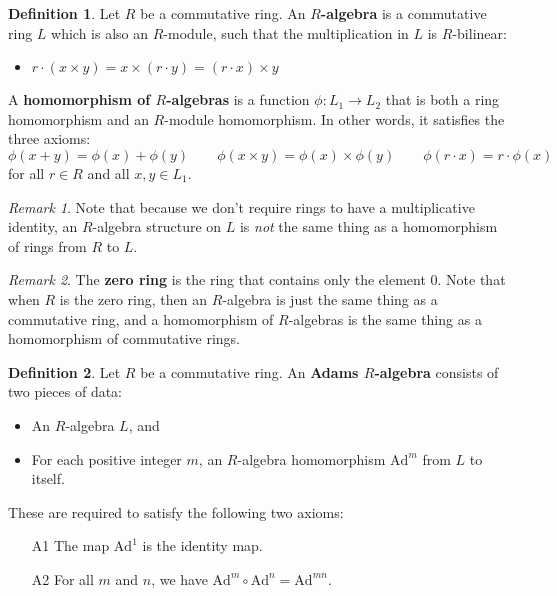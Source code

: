 \documentclass[a4paper]{article}
\theoremstyle{definition}
\newtheorem{definition}{Definition}[section]
\theoremstyle{remark}
\newtheorem*{remark}{Remark}
\newcommand{\ad}[1]{\text{Ad}^{#1}}
\newcommand{\defhl}[1]{\textbf{#1}}
\begin{document}
\begin{definition}
Let $R$ be a commutative ring. An \defhl{$R$-algebra} is a commutative ring $L$ which is also an $R$-module, such that the multiplication in $L$ is $R$-bilinear:
\begin{itemize}
\item $ r\cdot(x \times y) = x \times (r \cdot y) = (r \cdot x) \times y  $
\end{itemize}
A \defhl{homomorphism of $R$-algebras} is a function $\phi: L_1 \to L_2$ that is both a ring homomorphism and an $R$-module homomorphism. In other words, it satisfies the three axioms:
$$ \phi(x+y) = \phi(x) + \phi(y) \qquad \phi(x \times y) = \phi(x) \times \phi(y)  \qquad \phi(r \cdot x) = r  \cdot \phi(x)$$
for all $r \in R$ and all $x, y \in L_1$.

\end{definition}

\begin{remark}
Note that because we don't require rings to have a multiplicative identity, an $R$-algebra structure on $L$ is \emph{not} the same thing as a homomorphism of rings from $R$ to $L$. 
\end{remark}


\begin{remark}
The \defhl{zero ring} is the ring that contains only the element $0$. Note that when $R$ is the zero ring, then an $R$-algebra is just the same thing as a commutative ring, and a homomorphism of $R$-algebras is the same thing as a homomorphism of commutative rings.
\end{remark}


\begin{definition}
Let $R$ be a commutative ring. An \defhl{Adams $R$-algebra} consists of two pieces of data:
\begin{itemize}
\item An $R$-algebra $L$, and
\item For each positive integer $m$, an $R$-algebra homomorphism $\ad{m}$ from $L$ to itself.
\end{itemize}
These are required to satisfy the following two axioms:

\begin{itemize}
\item[A1] The map $\ad{1}$ is the identity map.
\item[A2] For all $m$ and $n$, we have $\ad{m} \circ \ad{n} = \ad{mn}$.
\end{itemize}
\end{definition}
\end{document}
